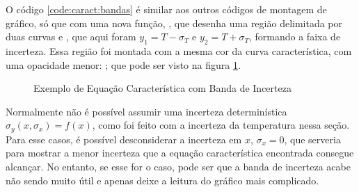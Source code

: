     O código \ref{code:caract:bandas} é similar aos outros códigos de montagem de gráfico, só que com uma nova função, , que desenha uma região delimitada por duas curvas  e , que aqui foram $y_1 = T - \sigma_T$ e $y_2 = T + \sigma_T$, formando a faixa de incerteza. Essa região foi montada com a mesma cor da curva característica, com uma opacidade menor: ; que pode ser visto na figura \ref{fig:caract:bandas}.

    \begin{figure}[H]
        \centering
        

        \caption{Exemplo de Equação Característica com Banda de Incerteza}
        \label{fig:caract:bandas}
    \end{figure}

    \begin{nota}
        Normalmente não é possível assumir uma incerteza determinística $\sigma_y(x, \sigma_x) = f(x)$, como foi feito com a incerteza da temperatura nessa seção. Para esse casos, é possível desconsiderar a incerteza em $x$, $\sigma_x = 0$, que serveria para mostrar a menor incerteza que a equação característica encontrada consegue alcançar. No entanto, se esse for o caso, pode ser que a banda de incerteza acabe não sendo muito útil e apenas deixe a leitura do gráfico mais complicado.
    \end{nota}
